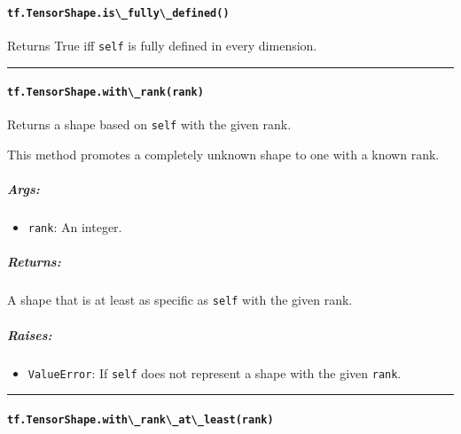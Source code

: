 \paragraph{\texorpdfstring{\lstinline{tf.TensorShape.is\_fully\_defined()}
}{tf.TensorShape.is\_fully\_defined() }}\label{tf.tensorshape.isux5ffullyux5fdefined}

Returns True iff \lstinline{self} is fully defined in every dimension.

\begin{center}\rule{0.5\linewidth}{\linethickness}\end{center}

\paragraph{\texorpdfstring{\lstinline{tf.TensorShape.with\_rank(rank)}
}{tf.TensorShape.with\_rank(rank) }}\label{tf.tensorshape.withux5frankrank}

Returns a shape based on \lstinline{self} with the given rank.

This method promotes a completely unknown shape to one with a known
rank.

\subparagraph{Args: }\label{args-33}

\begin{itemize}
\tightlist
\item
  \lstinline{rank}: An integer.
\end{itemize}

\subparagraph{Returns: }\label{returns-34}

A shape that is at least as specific as \lstinline{self} with the given
rank.

\subparagraph{Raises: }\label{raises-18}

\begin{itemize}
\tightlist
\item
  \lstinline{ValueError}: If \lstinline{self} does not represent a shape with
  the given \lstinline{rank}.
\end{itemize}

\begin{center}\rule{0.5\linewidth}{\linethickness}\end{center}

\paragraph{\texorpdfstring{\lstinline{tf.TensorShape.with\_rank\_at\_least(rank)}
}{tf.TensorShape.with\_rank\_at\_least(rank) }}\label{tf.tensorshape.withux5frankux5fatux5fleastrank}

